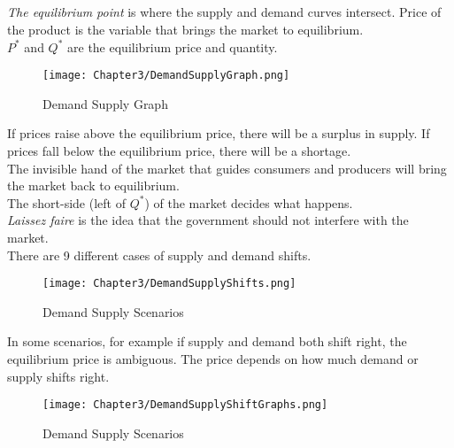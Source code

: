 \subsection{}

\begin{definition}
    \emph{The equilibrium point} is where the supply and demand curves intersect.
    Price of the product is the variable that brings the market to equilibrium.\\
    $P^*$ and $Q^*$ are the equilibrium price and quantity.\\
\end{definition}
\begin{figure}[h!]
    \centering
    \texttt{[image: Chapter3/DemandSupplyGraph.png]}
    \caption{Demand Supply Graph}
\end{figure}
If prices raise above the equilibrium price, there will be a surplus in supply. If prices fall below the equilibrium price, there will be a shortage.\\
The invisible hand of the market that guides consumers and producers will bring the market back to equilibrium.\\
The short-side (left of $Q^*$) of the market decides what happens.\\
\emph{Laissez faire} is the idea that the government should not interfere with the market.\\
There are 9 different cases of supply and demand shifts.\\
\begin{figure}
    \centering
    \texttt{[image: Chapter3/DemandSupplyShifts.png]}
    \caption{Demand Supply Scenarios}
\end{figure}
In some scenarios, for example if supply and demand both shift right, the equilibrium price is ambiguous.
The price depends on how much demand or supply shifts right.\\
\begin{figure}[H]
    \centering
    \texttt{[image: Chapter3/DemandSupplyShiftGraphs.png]}
    \caption{Demand Supply Scenarios}
\end{figure}